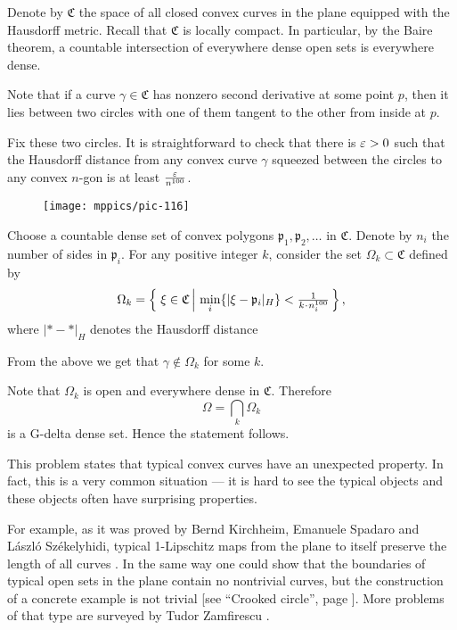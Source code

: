 
Denote by $\mathfrak{C}$ the space of all closed convex curves in the plane equipped with the Hausdorff metric.
Recall that $\mathfrak{C}$ is locally compact.
In particular, by the Baire theorem, a countable intersection of everywhere dense open sets is everywhere dense.

Note that if a curve $\gamma\in\mathfrak{C}$ 
has nonzero second derivative at some point $p$,
then it lies between two circles with one of them tangent to the other from inside at $p$.

Fix these two circles.
It is straightforward to check that there is $\varepsilon>0$ such that 
the Hausdorff distance from any convex curve $\gamma$ squeezed between the circles 
to any convex $n$-gon is at least $\frac{\varepsilon}{n^{100}}$.

\begin{wrapfigure}{o}{41 mm}
\vskip-0mm
\centering
\texttt{[image: mppics/pic-116]}
\end{wrapfigure}

Choose a countable dense set of convex polygons $\mathfrak{p}_1,\mathfrak{p}_2,\dots$ in $\mathfrak{C}$.
Denote by $n_i$ the number of sides in $\mathfrak{p}_i$.
For any positive integer $k$,
consider the set $\Omega_k\subset\mathfrak{C}$ defined by 
\[\Omega_k
=
\set{\xi\in \mathfrak{C}}{\min_i\{|\xi-\mathfrak{p}_i|_{H}\}<\tfrac1{k\cdot n_i^{100}}},\]
where $|{*}-{*}|_H$ denotes the Hausdorff distance 

From the above we get that $\gamma\notin\Omega_k$ for some $k$. 

Note that $\Omega_k$ is open and everywhere dense in $\mathfrak{C}$.
Therefore 
\[\Omega=\bigcap_k\Omega_k\]
is a G-delta dense set.
Hence the statement follows.\qeds

This problem states that typical convex curves have an unexpected property.
In fact, this is a very common situation --- it is hard to see the typical objects and these objects often have surprising properties.

For example, as it was proved by
Bernd Kirchheim, 
Emanuele Spadaro 
and 
L{\'a}szl{\'o} Sz{\'e}kelyhidi,
typical 1-Lipschitz maps from the plane to itself preserve the length of all curves \cite{KSS}.
In the same way one could show that the boundaries of typical open sets in the plane contain no nontrivial curves, 
but the construction of a concrete example is not trivial
[see ``Crooked circle'', page \pageref{Crooked circle}].
More problems of that type are surveyed by Tudor Zamfirescu \cite{zamfirescu}.







